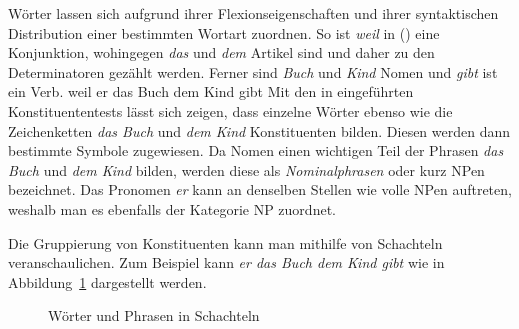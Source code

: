 Wörter lassen sich aufgrund ihrer Flexionseigenschaften und ihrer syntaktischen Distribution einer
bestimmten Wortart zuordnen. So ist \emph{weil} in ()
eine Konjunktion, wohingegen \emph{das} und \emph{dem}
Artikel sind und daher zu den Determinatoren gezählt werden. Ferner sind \emph{Buch} und \emph{Kind} Nomen
und \emph{gibt} ist ein Verb.
\ea\label{bsp-weil-er-das-buch-dem-mann-gibt}
weil er das Buch dem Kind gibt
\z
Mit den in  eingeführten Konstituententests lässt sich zeigen, dass
einzelne Wörter ebenso wie die Zeichenketten \emph{das Buch} und \emph{dem Kind}
Konstituenten bilden. Diesen werden dann bestimmte Symbole zugewiesen. Da Nomen einen wichtigen Teil
der Phrasen \emph{das Buch} und \emph{dem Kind} bilden, werden diese als \emph{Nominalphrasen} oder
kurz NPen bezeichnet. Das Pronomen \emph{er} kann an denselben Stellen wie volle NPen auftreten,
weshalb man es ebenfalls der Kategorie NP zuordnet.

Die Gruppierung von Konstituenten kann man mithilfe von Schachteln veranschaulichen. Zum Beispiel kann \emph{er das
  Buch dem Kind gibt} wie in Abbildung~\ref{fig-boxes} dargestellt werden.
\begin{figure}
\centering
{}
\caption{\label{fig-boxes}Wörter und Phrasen in Schachteln}
\end{figure}%

